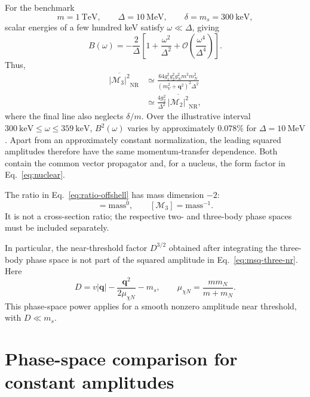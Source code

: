 \documentclass[prd,showpacs,preprintnumbers,amsmath,amssymb,twocolumn,
superscriptaddress,notitlepage]{revtex4-2}
\newcommand{\NR}{\mathrm{NR}}
\newcommand{\Msq}[1]{\overline{|\mathcal{M}_{#1}|^2}}
\newcommand{\qvec}{\boldsymbol{q}}
\begin{document}
For the benchmark
\begin{equation}
m=1~\mathrm{TeV},\qquad
\Delta=10~\mathrm{MeV},\qquad
\delta=m_s=300~\mathrm{keV},
\end{equation}
scalar energies of a few hundred keV satisfy $\omega\ll\Delta$, giving
\begin{equation}
B(\omega)=
-\frac{2}{\Delta}\left[
1+\frac{\omega^2}{\Delta^2}
+\mathcal{O}\!\left(\frac{\omega^4}{\Delta^4}\right)
\right].
\end{equation}
Thus,
\begin{equation}
\boxed{\begin{aligned}
\Msq{3}_{\NR}
&\simeq
\frac{64g_1^2g_2^2g_N^2m^2m_N^2}
{(m_V^2+\qvec^2)^2\Delta^2}\\
&\simeq\frac{4g_2^2}{\Delta^2}\,\Msq{2}_{\NR},
\end{aligned}}
\label{eq:ratio-offshell}
\end{equation}
where the final line also neglects $\delta/m$.
Over the illustrative interval $300~\mathrm{keV}\leq\omega\leq359~\mathrm{keV}$,
$B^2(\omega)$ varies by approximately $0.078\%$ for $\Delta=10~\mathrm{MeV}$.
Apart from an approximately constant normalization, the leading squared
amplitudes therefore have the same momentum-transfer dependence.
Both contain the common vector propagator and, for a nucleus,
the form factor in Eq.~\eqref{eq:nuclear}.

The ratio in Eq.~\eqref{eq:ratio-offshell} has mass dimension $-2$:
\begin{equation}
[\mathcal{M}_2]=\text{mass}^{0},\qquad
[\mathcal{M}_3]=\text{mass}^{-1}.
\end{equation}
It is not a cross-section ratio; the respective two- and three-body
phase spaces must be included separately.

In particular, the near-threshold factor $D^{3/2}$ obtained after
integrating the three-body phase space is not part of the squared
amplitude in Eq.~\eqref{eq:msq-three-nr}. Here
\begin{equation}
D=v|\qvec|-\frac{\qvec^2}{2\mu_{\chi N}}-m_s,\qquad
\mu_{\chi N}=\frac{mm_N}{m+m_N}.
\end{equation}
This phase-space power applies for a smooth nonzero amplitude near
threshold, with $D\ll m_s$.



\section{Phase-space comparison for constant amplitudes}
\label{sec:phase-space}
\end{document}
